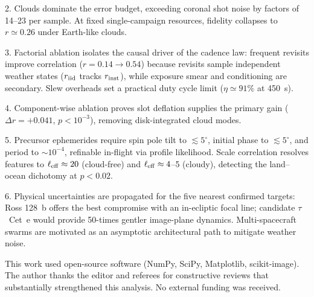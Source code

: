 \documentclass[twocolumn]{emulateapj}
\begin{document}
2. Clouds dominate the error budget, exceeding coronal shot noise by factors
of 14--23 per sample. At fixed single-campaign resources, fidelity collapses to
$r\simeq0.26$ under Earth-like clouds.

3. Factorial ablation isolates the causal driver of the cadence law: frequent
revisits improve correlation ($r=0.14\to0.54$) because revisits sample
independent weather states ($r_{\rm iid}$ tracks $r_{\rm inst}$), while
exposure smear and conditioning are secondary. Slew overheads set a practical
duty cycle limit ($\eta\simeq91\%$ at 450~s).

4. Component-wise ablation proves slot deflation supplies the primary gain
($\Delta r=+0.041$, $p<10^{-3}$), removing disk-integrated cloud modes.

5. Precursor ephemerides require spin pole tilt to $\lesssim5^\circ$, initial
phase to $\lesssim5^\circ$, and period to $\sim10^{-4}$, refinable in-flight
via profile likelihood. Scale correlation resolves features to $\ell_{\rm eff}\approx20$
(cloud-free) and $\ell_{\rm eff}\approx4$--5 (cloudy), detecting the land--ocean
dichotomy at $p<0.02$.

6. Physical uncertainties are propagated for the five nearest confirmed targets:
Ross 128~b offers the best compromise with an in-ecliptic focal line; candidate
$\tau$~Cet~e would provide 50-times gentler image-plane dynamics. Multi-spacecraft
swarms are motivated as an asymptotic architectural path to mitigate weather noise.

\acknowledgments
This work used open-source software (NumPy, SciPy, Matplotlib, scikit-image).
The author thanks the editor and referees for constructive reviews that
substantially strengthened this analysis. No external funding was received.
\end{document}

